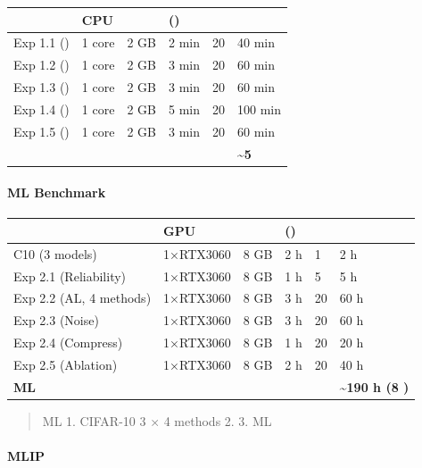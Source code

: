 \documentclass[
  12pt,
]{article}
\begin{document}
\begin{longtable}[]{@{}llllll@{}}
\toprule\noalign{}
 & CPU &  &  () &  &  \\
\midrule\noalign{}
\endhead
\bottomrule\noalign{}
\endlastfoot
Exp 1.1 () & 1 core & 2 GB & 2 min & 20 & 40 min \\
Exp 1.2 () & 1 core & 2 GB & 3 min & 20 & 60 min \\
Exp 1.3 () & 1 core & 2 GB & 3 min & 20 & 60 min \\
Exp 1.4 () & 1 core & 2 GB & 5 min & 20 & 100 min \\
Exp 1.5 () & 1 core & 2 GB & 3 min & 20 & 60 min \\
\textbf{} & & & & & \textbf{\textasciitilde5 } \\
\end{longtable}

\paragraph{ML Benchmark}\label{ml-benchmark}

\begin{longtable}[]{@{}llllll@{}}
\toprule\noalign{}
 & GPU &  &  () &  &  \\
\midrule\noalign{}
\endhead
\bottomrule\noalign{}
\endlastfoot
C10  (3 models) & 1×RTX3060 & 8 GB & 2 h & 1 & 2 h \\
Exp 2.1 (Reliability) & 1×RTX3060 & 8 GB & 1 h & 5 & 5 h \\
Exp 2.2 (AL, 4 methods) & 1×RTX3060 & 8 GB & 3 h & 20 & 60 h \\
Exp 2.3 (Noise) & 1×RTX3060 & 8 GB & 3 h & 20 & 60 h \\
Exp 2.4 (Compress) & 1×RTX3060 & 8 GB & 1 h & 20 & 20 h \\
Exp 2.5 (Ablation) & 1×RTX3060 & 8 GB & 2 h & 20 & 40 h \\
\textbf{ML } & & & & & \textbf{\textasciitilde190 h (8 )} \\
\end{longtable}

\begin{quote}
ML  1.  CIFAR-10 3  ×
4 methods 2.  3.
ML 
\end{quote}

\paragraph{MLIP }\label{mlip-ux6848ux4f8b}
\end{document}
